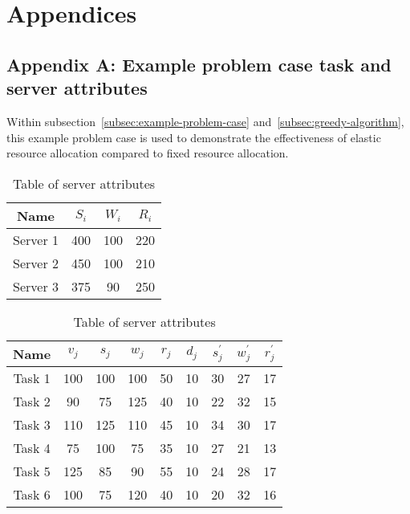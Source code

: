 \section*{Appendices}

\subsection*{Appendix A: Example problem case task and server attributes}
Within subsection~\ref{subsec:example-problem-case} and~\ref{subsec:greedy-algorithm}, this example problem case is used
to demonstrate the effectiveness of elastic resource allocation compared to fixed resource allocation.
\begin{table}[h]
    \begin{minipage}{1.8in}
        \begin{tabular}{|c|c|c|c|}
            \hline
            Name     & $S_i$ & $W_i$ & $R_i$ \\ \hline
            Server 1 & 400   & 100   & 220   \\ \hline
            Server 2 & 450   & 100   & 210   \\ \hline
            Server 3 & 375   & 90    & 250   \\ \hline
        \end{tabular}
        \caption{Table of server attributes}
    \end{minipage}
    \begin{minipage}{3.5in}
        \begin{tabular}{|c|c|c|c|c|c|c|c|c|}
            \hline
            Name    & $v_j$ & $s_j$ & $w_j$ & $r_j$ & $d_j$ & $s^{'}_j$ & $w^{'}_j$ & $r^{'}_j$ \\ \hline
            Task 1  & 100   & 100   & 100   & 50    & 10    & 30        & 27        & 17        \\ \hline
            Task 2  & 90    & 75    & 125   & 40    & 10    & 22        & 32        & 15        \\ \hline
            Task 3  & 110   & 125   & 110   & 45    & 10    & 34        & 30        & 17        \\ \hline
            Task 4  & 75    & 100   & 75    & 35    & 10    & 27        & 21        & 13        \\ \hline
            Task 5  & 125   & 85    & 90    & 55    & 10    & 24        & 28        & 17        \\ \hline
            Task 6  & 100   & 75    & 120   & 40    & 10    & 20        & 32        & 16        \\ \hline

\end{tabular}
\end{minipage}
\end{table}
